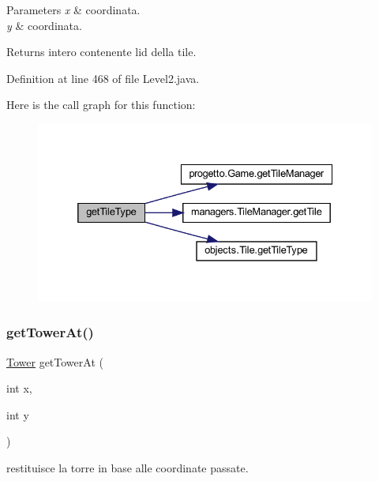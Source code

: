 \begin{DoxyParams}{Parameters}
{\em x} & coordinata. \\
\hline
{\em y} & coordinata.\\
\hline
\end{DoxyParams}
\begin{DoxyReturn}{Returns}
intero contenente l\textquotesingle{}id della tile. 
\end{DoxyReturn}


Definition at line 468 of file Level2.\+java.

Here is the call graph for this function\+:
\nopagebreak
\begin{figure}[H]
\begin{center}
\leavevmode
\includegraphics[width=332pt]{classscenes_1_1_level2_ac689e72523c8460ac3160526d310b1b7_cgraph}
\end{center}
\end{figure}
\mbox{\label{classscenes_1_1_level2_a4345f2e80059788e5ab1dd1cf0ff2c04}} 
\subsubsection{\texorpdfstring{get\+Tower\+At()}{getTowerAt()}}
{\footnotesize\ttfamily \hyperlink{classtowers_1_1_tower}{Tower} get\+Tower\+At (\begin{DoxyParamCaption}\item[{int}]{x,  }\item[{int}]{y }\end{DoxyParamCaption})\hspace{0.3cm}{\ttfamily [private]}}



restituisce la torre in base alle coordinate passate. 


